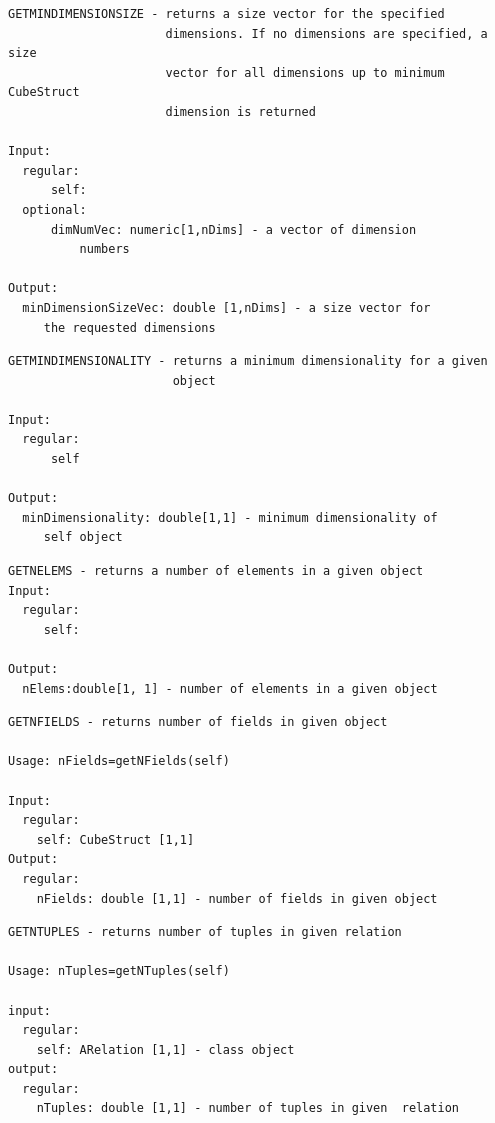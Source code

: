 \documentclass[letterpaper,10pt,english]{sphinxmanual}
\begin{document}
\begin{Verbatim}[commandchars=\\\{\}]
GETMINDIMENSIONSIZE - returns a size vector for the specified
                      dimensions. If no dimensions are specified, a size
                      vector for all dimensions up to minimum CubeStruct
                      dimension is returned

Input:
  regular:
      self:
  optional:
      dimNumVec: numeric[1,nDims] - a vector of dimension
          numbers

Output:
  minDimensionSizeVec: double [1,nDims] - a size vector for
     the requested dimensions
\end{Verbatim}

\begin{Verbatim}[commandchars=\\\{\}]
GETMINDIMENSIONALITY - returns a minimum dimensionality for a given
                       object

Input:
  regular:
      self

Output:
  minDimensionality: double[1,1] - minimum dimensionality of
     self object
\end{Verbatim}

\begin{Verbatim}[commandchars=\\\{\}]
GETNELEMS - returns a number of elements in a given object
Input:
  regular:
     self:

Output:
  nElems:double[1, 1] - number of elements in a given object
\end{Verbatim}

\begin{Verbatim}[commandchars=\\\{\}]
GETNFIELDS - returns number of fields in given object

Usage: nFields=getNFields(self)

Input:
  regular:
    self: CubeStruct [1,1]
Output:
  regular:
    nFields: double [1,1] - number of fields in given object
\end{Verbatim}

\begin{Verbatim}[commandchars=\\\{\}]
GETNTUPLES - returns number of tuples in given relation

Usage: nTuples=getNTuples(self)

input:
  regular:
    self: ARelation [1,1] - class object
output:
  regular:
    nTuples: double [1,1] - number of tuples in given  relation
\end{Verbatim}
\end{document}

